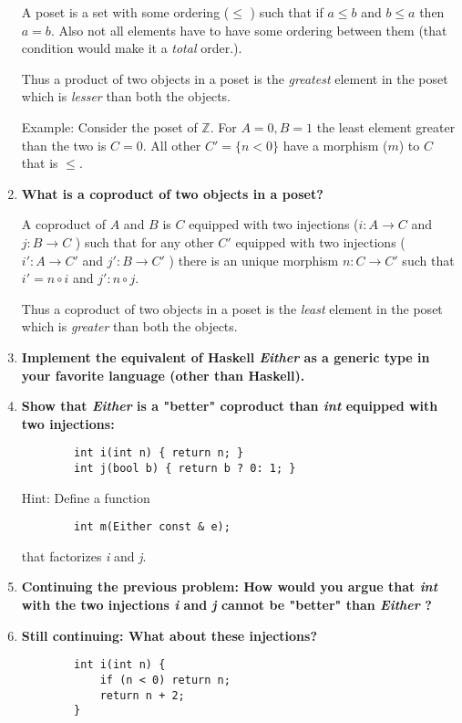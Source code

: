 \documentclass{article}
\begin{document}
\begin{enumerate}
	      A poset is a set with some ordering ($ \leq $ ) such that if $ a \leq b $ and $ b \leq a $ then $ a = b $. Also not all elements have to have some ordering between them (that condition would make it a \textit{total} order.).

	      Thus a product of two objects in a poset is the \textit{greatest} element in the poset which is \textit{lesser} than both the objects.

	      Example:
	      Consider the poset of  $ \mathbb{Z} $. For $ A = 0, B = 1 $ the least element greater than the two is $ C = 0 $. All other $ C' = \{ n < 0 \}$  have a morphism ($ m  $)  to $ C $ that is $ \leq $.



	\item \textbf{What is a coproduct of two objects in a poset?}

	      A coproduct of  $ A $ and $ B $ is $ C $ equipped with two injections ($ i : A \to C $ and $ j : B \to C $ ) such that for any other $ C' $ equipped with two injections ($ i' : A \to C' $ and $ j' : B \to C' $ ) there is an unique morphism $ n : C \to C' $ such that $ i' = n \circ i $  and $ j' : n \circ j $.


	      Thus a coproduct of two objects in a poset is the \textit{least} element in the poset which is \textit{greater} than both the objects.


	\item \textbf{Implement the equivalent of Haskell \textit{Either} as a generic type in your favorite language (other than Haskell).}
	\item \textbf{Show that \textit{Either} is a "better" coproduct than \textit{int} equipped with two injections:}
	      \begin{verbatim}
		int i(int n) { return n; }	
		int j(bool b) { return b ? 0: 1; }
		\end{verbatim}
	      Hint: Define a function
	      \begin{verbatim}
		int m(Either const & e);	
		\end{verbatim}
	      that factorizes \textit{i} and \textit{j}.
	\item \textbf{Continuing the previous problem: How would you argue that \textit{int} with the two injections \textit{i} and \textit{j} cannot be "better" than \textit{Either} ?}
	\item \textbf{Still continuing: What about these injections?}
	      \begin{verbatim}
		int i(int n) {
			if (n < 0) return n;
			return n + 2;
		}
		

\end{verbatim}
\end{enumerate}
\end{document}
